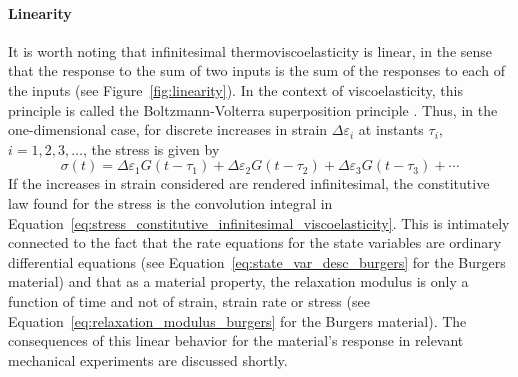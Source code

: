 \paragraph{Linearity}
It is worth noting that infinitesimal thermoviscoelasticity is linear, in the sense that the response to the sum of two inputs is the sum of the responses to each of the inputs (see Figure~\ref{fig:linearity}).
In the context of viscoelasticity, this principle is called the Boltzmann-Volterra superposition principle \citep{wardIntroductionMechanicalProperties2004}.
Thus, in the one-dimensional case, for discrete increases in strain $\Delta \varepsilon_i$ at instants $\tau_i$, $i=1,2,3,\dots$, the stress is given by
\begin{equation}
	\sigma (t) = \Delta \varepsilon_1 G(t - \tau_1) + \Delta \varepsilon_2 G(t - \tau_2) + \Delta \varepsilon_3 G(t - \tau_3) + \cdots
\end{equation}
If the increases in strain considered are rendered infinitesimal, the constitutive law found for the stress is the convolution integral in Equation~\eqref{eq:stress_constitutive_infinitesimal_viscoelasticity}.
This is intimately connected to the fact that the rate equations for the state variables are ordinary differential equations (see Equation~\eqref{eq:state_var_desc_burgers} for the Burgers material) and that as a material property, the relaxation modulus is only a function of time and not of strain, strain rate or stress (see Equation~\eqref{eq:relaxation_modulus_burgers} for the Burgers material).
The consequences of this linear behavior for the material's response in relevant mechanical experiments are discussed shortly.
